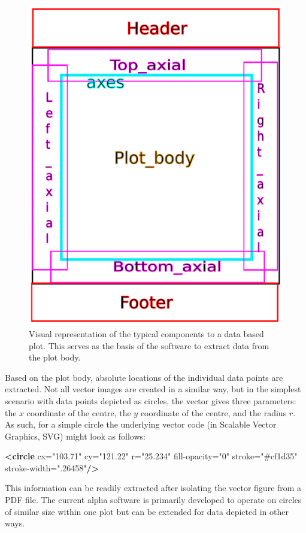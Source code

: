 \documentclass[a5paper]{book}
\newenvironment{Shaded}{\begin{snugshade}}{\end{snugshade}}
\newcommand{\KeywordTok}[1]{\textcolor[rgb]{0.13,0.29,0.53}{\textbf{#1}}}
\newcommand{\StringTok}[1]{\textcolor[rgb]{0.31,0.60,0.02}{#1}}
\newcommand{\OtherTok}[1]{\textcolor[rgb]{0.56,0.35,0.01}{#1}}
\begin{document}
\begin{figure}

{\centering \includegraphics[width=0.4\linewidth]{assets/figures/plot-components} 

}

\caption{Visual representation of the typical components to a data based plot. This serves as the basis of the software to extract data from the plot body.}\label{fig:vector-fig1}
\end{figure}

Based on the plot body, absolute locations of the individual data points
are extracted. Not all vector images are created in a similar way, but
in the simplest scenario with data points depicted as circles, the
vector gives three parameters: the \(x\) coordinate of the centre, the
\(y\) coordinate of the centre, and the radius \(r\). As such, for a
simple circle the underlying vector code (in Scalable Vector Graphics,
SVG) might look as follows:

\begin{Shaded}
\begin{Highlighting}[]
\KeywordTok{<circle}\OtherTok{ cx=}\StringTok{"103.71"}\OtherTok{ cy=}\StringTok{"121.22"}\OtherTok{ r=}\StringTok{"25.234"}\OtherTok{ fill-opacity=}\StringTok{"0"}
\OtherTok{        stroke=}\StringTok{"#cf1d35"} 
\OtherTok{        stroke-width=}\StringTok{".26458"}\KeywordTok{/>}
\end{Highlighting}
\end{Shaded}

This information can be readily extracted after isolating the vector
figure from a PDF file. The current alpha software is primarily
developed to operate on circles of similar size within one plot but can
be extended for data depicted in other ways.
\end{document}
